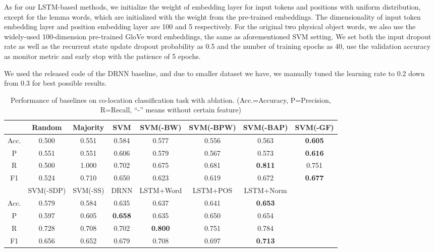As for our LSTM-based methods, we initialize the weight of embedding 
layer for input tokens and positions with uniform distribution, 
except for the lemma words, which are initialized with the weight from 
the pre-trained embeddings. The dimensionality of input token embedding layer and position embedding layer are 100 and 5 respectively. For the original two physical object words, we also use the widely-used 100-dimension pre-trained GloVe word embeddings, the same as aforementioned SVM setting. 
We set both the input dropout rate as well as the recurrent state update dropout probability as 0.5 and the number of training epochs as 40, use the validation accuracy as monitor metric and early stop with the patience of 5 epochs.

We used the released code of the DRNN baseline, and due to smaller dataset we have, we manually tuned the learning rate to 0.2 down from 0.3 for best possible results.

\begin{table}[t]
	\centering
	\begin{tabular}{|c|c|c|c|c|c|c|c|}
		\hline
		& Random       & Majority    & SVM  & SVM(-BW)    & SVM(-BPW) & SVM(-BAP)   & SVM(-GF)    \\ \hline
		Acc.  & 0.500        & 0.551       & 0.584                                & 0.577          & 0.556        & 0.563          & \textbf{0.605} \\ \hline
		P & 0.551        & 0.551       & 0.606                                & 0.579          & 0.567        & 0.573          & \textbf{0.616} \\ \hline
		R    & 0.500        & 1.000       & 0.702                                & 0.675          & 0.681        & \textbf{0.811} & 0.751          \\ \hline
		F1        & 0.524        & 0.710       & 0.650                                & 0.623          & 0.619        & 0.672          & \textbf{0.677} \\ \hline \hline
		& SVM(-SDP) & SVM(-SS) & DRNN & LSTM+Word    & LSTM+POS   & LSTM+Norm    &                \\ \hline
		Acc.  & 0.579        & 0.584       & 0.635                                & 0.637          & 0.641        & \textbf{0.653} &                \\ \hline
		P & 0.597        & 0.605       & \textbf{0.658}                       & 0.635          & 0.650        & 0.654          &                \\ \hline
		R    & 0.728        & 0.708       & 0.702                                & \textbf{0.800} & 0.751        & 0.784          &                \\ \hline
		F1        & 0.656        & 0.652       & 0.679                                & 0.708          & 0.697        & \textbf{0.713} &                \\ \hline
	\end{tabular}
	\caption{Performance of baselines on co-location classification task with ablation. (Acc.=Accuracy, P=Precision, R=Recall, ``-'' means without certain feature)}
	\label{tab:aprf}
\end{table}
